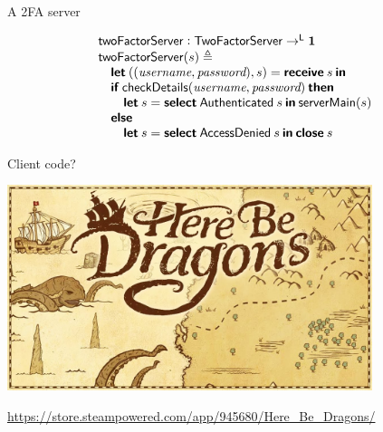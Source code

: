\documentclass[11.5pt, aspectratio=169]{beamer}
\begin{document}
\begin{frame}{A 2FA server}

{\large
\[
  \begin{array}{l}
  \mathsf{twoFactorServer} : \mathsf{TwoFactorServer} \to^{\mathsf{L}} \mathbf{1} \\
  \mathsf{twoFactorServer}(s) \triangleq \\
  \quad \textbf{\textsf{let}} \: ((\textit{username}, \textit{password}), s) = \textbf{\textsf{receive}} \: s \: \textbf{\textsf{in}} \\
  \quad \textbf{\textsf{if}} \: \mathsf{checkDetails}(\textit{username},
  \textit{password})\: \textbf{\textsf{then}} \\
  \qquad \textbf{\textsf{let}} \: s = \textbf{\textsf{select}} \: \mathsf{Authenticated} \: s \: \textbf{\textsf{in}} \: \mathsf{serverMain}(s) \\
  \quad \textbf{\textsf{else}} \\
  \qquad \textbf{\textsf{let}} \: s = \textbf{\textsf{select}} \: \mathsf{AccessDenied} \: s \: \textbf{\textsf{in}} \: \textbf{\textsf{close}} \: s \\
  \end{array}
\]
}
\end{frame}

\begin{frame}{Client code?}

  \pause
  \begin{center}
    \includegraphics[width=0.8\textwidth]{images/here-be-dragons.jpg}
\end{center}
\hfill \tiny{\url{https://store.steampowered.com/app/945680/Here_Be_Dragons/}}
\end{frame}
\end{document}
